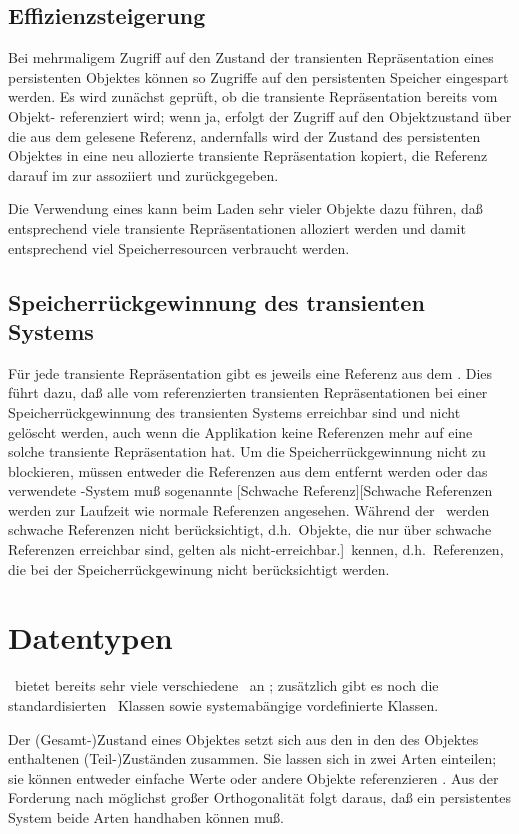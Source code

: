 \subsection{Effizienzsteigerung}
%
Bei mehrmaligem Zugriff auf den Zustand der transienten
Repr\"{a}sentation eines persistenten Objektes k\"{o}nnen so
Zugriffe auf den persistenten Speicher eingespart werden. Es wird
zun\"{a}chst gepr\"{u}ft, ob die transiente Repr\"{a}sentation bereits vom
Objekt-\cache\/ referenziert wird; wenn ja, erfolgt der Zugriff auf den
Objektzustand \"{u}ber die aus dem \cache\/ gelesene Referenz,
andernfalls wird der Zustand des persistenten Objektes
in eine neu allozierte transiente Repr\"{a}sentation kopiert, die
Referenz darauf im \cache\/ zur \objid\/ assoziiert und zur\"{u}ckgegeben.
%
\par{}Die Verwendung eines \cache\/ kann beim Laden sehr vieler Objekte
dazu f\"{u}hren, da\ss{} entsprechend viele transiente Repr\"{a}sentationen
alloziert werden und damit entsprechend viel Speicherresourcen
verbraucht werden.
%
\subsection{Speicherr\"{u}ckgewinnung des transienten Systems}
%
F\"{u}r jede transiente Repr\"{a}sentation gibt es jeweils eine Referenz aus
dem \cache. Dies f\"{u}hrt dazu, da\ss{} alle vom \cache\/ referenzierten
transienten Repr\"{a}sentationen bei einer
Spei\-cher\-r\"{u}ck\-ge\-win\-nung des transienten Systems erreichbar
sind und nicht gel\"{o}scht werden, auch wenn die Applikation keine
Referenzen mehr auf eine solche transiente Repr\"{a}sentation hat. Um die
Spei\-cher\-r\"{u}ck\-ge\-win\-nung nicht zu blockieren, m\"{u}ssen entweder
die Referenzen aus dem
\cache\/ entfernt werden oder das verwendete \cl-System mu\ss{} sogenannte
[Schwache Referenz][Schwache
Referenzen werden zur Laufzeit wie normale Referenzen angesehen.
W\"{a}hrend der \protect{}\ werden schwache
Referenzen nicht ber\"{u}cksichtigt, d.h.\ Objekte, die nur \"{u}ber
schwache Referenzen erreichbar sind, gelten als
nicht-erreichbar.]\ kennen, d.h.\ Referenzen, die bei der
Speicherr\"{u}ckgewinung nicht ber\"{u}cksichtigt werden.
%
\section{Datentypen}
%
\cl\ bietet bereits sehr viele verschiedene
\ an ; zus\"{a}tzlich
gibt es noch die standardisierten \clos\ Klassen sowie
systemab\"{a}ngige vordefinierte Klassen.
%
\par{}Der \mbox{(Ge\-samt-)}Zu\-stand eines Objektes setzt sich aus den in
den \Slt[s]\/ des Objektes enthaltenen \mbox{(Teil-)}Zu\-st\"{a}n\-den
zusammen.  Sie lassen sich in zwei Arten einteilen; sie k\"{o}nnen
entweder einfache Werte oder andere Objekte referenzieren
\cite[]{bib:sche92}. Aus der Forderung nach m\"{o}glichst
gro\ss{}er Orthogonalit\"{a}t folgt daraus, da\ss{} ein persistentes
System beide Arten handhaben k\"{o}nnen mu\ss{}.
%
